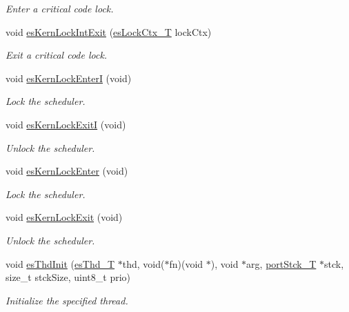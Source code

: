 \begin{DoxyCompactItemize}
\begin{DoxyCompactList}\small\item\em Enter a critical code lock. \end{DoxyCompactList}\item 
void \hyperlink{group__kern__impl_gad8cb192a48802804cc12162edd18668d}{es\-Kern\-Lock\-Int\-Exit} (\hyperlink{group__kern__lock_gad8b2b8257c3bf42c064adb66c0d45e2e}{es\-Lock\-Ctx\-\_\-\-T} lock\-Ctx)
\begin{DoxyCompactList}\small\item\em Exit a critical code lock. \end{DoxyCompactList}\item 
void \hyperlink{group__kern__impl_ga6dd45355c20a10f7272bd39670353428}{es\-Kern\-Lock\-Enter\-I} (void)
\begin{DoxyCompactList}\small\item\em Lock the scheduler. \end{DoxyCompactList}\item 
void \hyperlink{group__kern__impl_ga3287aefb2c7dd24672c716d86a008ad3}{es\-Kern\-Lock\-Exit\-I} (void)
\begin{DoxyCompactList}\small\item\em Unlock the scheduler. \end{DoxyCompactList}\item 
void \hyperlink{group__kern__impl_ga86ec4f4cbaa889b0f23c7e2ebdcbbb97}{es\-Kern\-Lock\-Enter} (void)
\begin{DoxyCompactList}\small\item\em Lock the scheduler. \end{DoxyCompactList}\item 
void \hyperlink{group__kern__impl_gaf1eec663f7cc5c414b113901382ccd82}{es\-Kern\-Lock\-Exit} (void)
\begin{DoxyCompactList}\small\item\em Unlock the scheduler. \end{DoxyCompactList}\item 
void \hyperlink{group__kern__impl_gac91734f3ee867b519f59bf81cc7fde88}{es\-Thd\-Init} (\hyperlink{group__kern__thd_ga62e3a3ca0a4597a19c43cb8868810d82}{es\-Thd\-\_\-\-T} $\ast$thd, void($\ast$fn)(void $\ast$), void $\ast$arg, \hyperlink{group__template__cpu__intf_ga13cc91970e3e05fe4210440c068d3f4a}{port\-Stck\-\_\-\-T} $\ast$stck, size\-\_\-t stck\-Size, uint8\-\_\-t prio)
\begin{DoxyCompactList}\small\item\em Initialize the specified thread. \end{DoxyCompactList}\item 

\end{DoxyCompactItemize}

